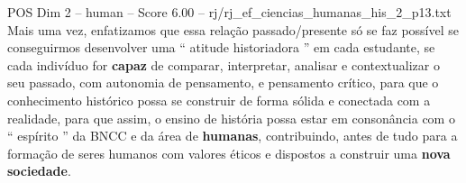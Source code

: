 \begin{textsample}{POS Dim 2 – human – Score 6.00 – rj/rj\_ef\_ciencias\_humanas\_his\_2\_p13.txt}  \label{ex:f2_pos_018}
Mais uma vez, enfatizamos que essa relação passado/presente só se faz possível se conseguirmos desenvolver uma “ atitude historiadora ” em cada estudante, se cada indivíduo for \textbf{capaz} de comparar, interpretar, analisar e contextualizar o seu passado, com autonomia de pensamento, e pensamento crítico, para que o conhecimento histórico possa se construir de forma sólida e conectada com a realidade, para que assim, o ensino de história possa estar em consonância com o “ espírito ” da BNCC e da área de \textbf{humanas}, contribuindo, antes de tudo para a formação de seres humanos com valores éticos e dispostos a construir uma \textbf{nova} \textbf{sociedade}.

\end{textsample}
